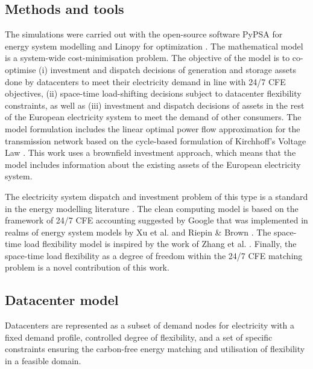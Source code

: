 %

\subsection{Methods and tools}

The simulations were carried out with the open-source software PyPSA for energy system modelling \cite{horschPyPSAEurOpenOptimisation2018} and Linopy for optimization \cite{LinopyLinearOptimization2024}.
The mathematical model is a system-wide cost-minimisation problem.
The objective of the model is to co-optimise (i) investment and dispatch decisions of generation and storage assets done by datacenters to meet their electricity demand in line with 24/7 CFE objectives, (ii) space-time load-shifting decisions subject to datacenter flexibility constraints, as well as (iii) investment and dispatch decisions of assets in the rest of the European electricity system to meet the demand of other consumers.
The model formulation includes the linear optimal power flow approximation for the transmission network based on the cycle-based formulation of Kirchhoff's Voltage Law \cite{horschLinearOptimalPower2018}. This work uses a brownfield investment approach, which means that the model includes information about the existing assets of the European electricity system.

The electricity system dispatch and investment problem of this type is a standard in the energy modelling literature \cite{OpenModelsWikib}. The clean computing model is based on the framework of 24/7 CFE accounting suggested by Google \cite{google-methodologies} that was implemented in realms of energy system models by Xu et al. \cite{xu-247CFE-report} and Riepin \& Brown \cite{riepinMeansCostsSystemlevel2023}. The space-time load flexibility model is inspired by the work of Zhang et al. \cite{zhangRemuneratingSpaceTime2022}. Finally, the space-time load flexibility as a degree of freedom within the 24/7 CFE matching problem is a novel contribution of this work.


\subsection{Datacenter model}

Datacenters are represented as a subset of demand nodes for electricity with a fixed demand profile, controlled degree of flexibility, and a set of specific constraints ensuring the carbon-free energy matching and utilisation of flexibility in a feasible domain.

